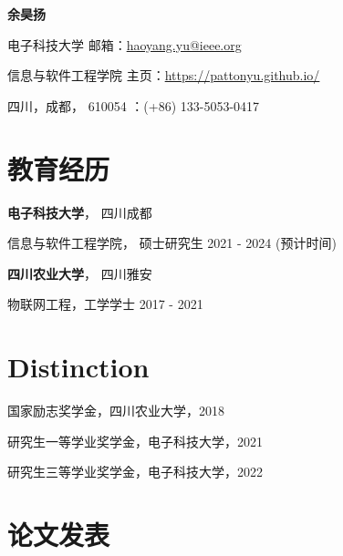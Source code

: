\documentclass{article}
\begin{document}
\begin{center}
    \vspace*{5pt}
    \Huge{
    \textbf{余昊扬}}
\end{center}
\vspace{15pt}


\setlength{\parskip}{1pt}

\noindent 电子科技大学 \hfill 邮箱：\href{haoyang.yu@ieee.org}{haoyang.yu@ieee.org}

\noindent 信息与软件工程学院 \hfill 主页：\url{https://pattonyu.github.io/}

\noindent 四川，成都， 610054 ：(+86) 133-5053-0417

\setlength{\parskip}{3pt}






\section*{教育经历}
\indent 
\textbf{电子科技大学}， 四川成都

\hspace{2em}信息与软件工程学院， 硕士研究生 2021 - 2024 (预计时间)

\textbf{四川农业大学}， 四川雅安

\hspace{2em}物联网工程，工学学士 2017 - 2021




\section*{Distinction}
\indent
国家励志奖学金，四川农业大学，2018

研究生一等学业奖学金，电子科技大学，2021

研究生三等学业奖学金，电子科技大学，2022


\section*{论文发表}
\end{document}
